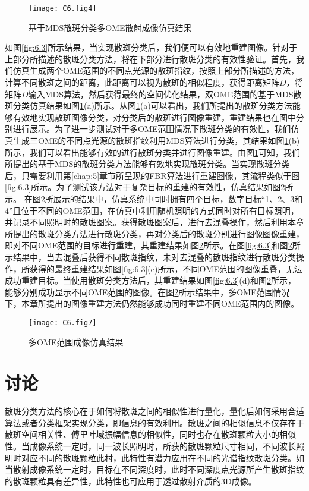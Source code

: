 \begin{figure}[htp!]
	\centering
	\texttt{[image: C6.fig4]}
	\caption{基于MDS散斑分类多OME散射成像仿真结果}
	\label{fig:6.4}
\end{figure}

如图\ref{fig:6.3}所示结果，当实现散斑分类后，我们便可以有效地重建图像。针对于上部分所描述的散斑分类方法，将在下部分进行散斑分类的有效性验证。首先，我们仿真生成两个OME范围的不同点光源的散斑指纹，按照上部分所描述的方法，计算不同散斑之间的距离，此距离可以视为散斑的相似程度，获得距离矩阵$D$，将矩阵$D$输入MDS算法，然后获得最终的空间优化结果，双OME范围的基于MDS散斑分类仿真结果如图\ref{fig:6.4}(a)所示。从图\ref{fig:6.4}(a)可以看出，我们所提出的散斑分类方法能够有效地实现散斑图像分类，对分类后的散斑进行图像重建，重建结果也在图中分别进行展示。为了进一步测试对于多OME范围情况下散斑分类的有效性，我们仿真生成三OME的不同点光源的散斑指纹利用MDS算法进行分类，其结果如图\ref{fig:6.4}(b)所示，我们可以看出能够有效的进行散斑分类并进行图像重建。由图\ref{fig:6.4}可知，我们所提出的基于MDS的散斑分类方法能够有效地实现散斑分类。当实现散斑分类后，只需要利用第\ref{chap:5}章节所呈现的FBR算法进行重建图像，其流程类似于图\ref{fig:6.3}所示。为了测试该方法对于复杂目标的重建的有效性，仿真结果如图\ref{fig:6.7}所示。
在图\ref{fig:6.7}所展示的结果中，仿真系统中同时拥有四个目标，数字目标“1、2、3和4”且位于不同的OME范围，在仿真中利用随机照明的方式同时对所有目标照明，并记录不同照明时的散斑图案。获得散斑图案后，进行去混叠操作，然后利用本章所提出的散斑分类方法进行散斑分类，再对分类后的散斑分别进行图像图像重建，即对不同OME范围的目标进行重建，其重建结果如图\ref{fig:6.7}所示。在图\ref{fig:6.3}和图\ref{fig:6.7}所示结果中，当去混叠后获得不同散斑指纹，未对去混叠的散斑指纹进行散斑分类操作，所获得的最终重建结果如图\ref{fig:6.3}(e)所示，不同OME范围的图像重叠，无法成功重建目标。当使用散斑分类方法后，其重建结果如图\ref{fig:6.3}(d)和图\ref{fig:6.7}所示，能够分别成功显示不同OME范围的图像。在图\ref{fig:6.7}所示结果中，多OME范围情况下，本章所提出的图像重建方法仍然能够成功同时重建不同OME范围内的图像。

\begin{figure}[htp]
	\centering
	\texttt{[image: C6.fig7]}
	\caption{多OME范围成像仿真结果}
	\label{fig:6.7}
\end{figure}


\section{讨论}

散斑分类方法的核心在于如何将散斑之间的相似性进行量化，量化后如何采用合适算法或者分类框架实现分类，即信息的有效利用。散斑之间的相似信息不仅存在于散斑空间相关性、傅里叶域振幅信息的相似性，同时也存在散斑颗粒大小的相似性。当成像系统一定时，同一波长照明时，所获的散斑颗粒尺寸相同，不同波长照明时对应不同的散斑颗粒此村，此特性有潜力应用在不同的光谱指纹散斑分类。如当散射成像系统一定时，目标在不同深度时，此时不同深度点光源所产生散斑指纹的散斑颗粒具有差异性，此特性也可应用于透过散射介质的3D成像。

